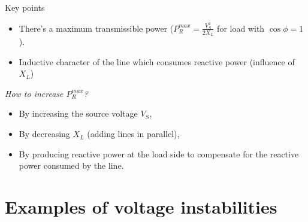 \begin{frame}{Key points}
\begin{itemize}
    \item There's a maximum transmissible power ($P_{R}^{max} = \frac{V_S^2}{2 X_L}$ for load with $\cos \phi = 1$).
    \item Inductive character of the line which consumes reactive power (influence of $X_L$)
\end{itemize}
\emph{How to increase $P_{R}^{max}$?}
\begin{itemize}
    \item By increasing the source voltage $V_S$,
    \item By decreasing $X_L$ (adding lines in parallel),
    \item By producing reactive power at the load side to compensate for the reactive power consumed by the line.
\end{itemize}
\end{frame}

\section{Examples of voltage instabilities}

